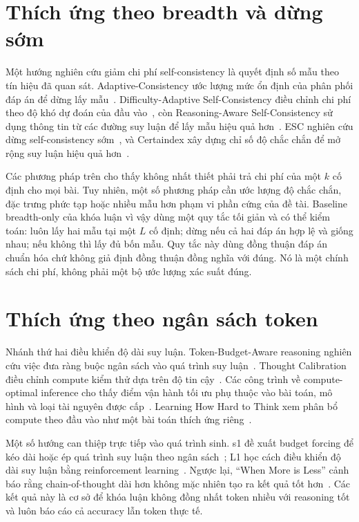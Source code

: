 \section{Thích ứng theo breadth và dừng sớm}

Một hướng nghiên cứu giảm chi phí self-consistency là quyết định số mẫu theo tín hiệu
đã quan sát. Adaptive-Consistency ước lượng mức ổn định của phân phối đáp án để dừng
lấy mẫu~\cite{aggarwal2023adaptive}. Difficulty-Adaptive Self-Consistency điều chỉnh
chi phí theo độ khó dự đoán của đầu vào~\cite{wang2025penny}, còn Reasoning-Aware
Self-Consistency sử dụng thông tin từ các đường suy luận để lấy mẫu hiệu quả
hơn~\cite{wan2025rasc}. ESC nghiên cứu dừng self-consistency sớm~\cite{li2024esc}, và
Certaindex xây dựng chỉ số độ chắc chắn để mở rộng suy luận hiệu quả
hơn~\cite{fu2025certaindex}.

Các phương pháp trên cho thấy không nhất thiết phải trả chi phí của một $k$ cố định
cho mọi bài. Tuy nhiên, một số phương pháp cần ước lượng độ chắc chắn, đặc trưng phức
tạp hoặc nhiều mẫu hơn phạm vi phần cứng của đề tài. Baseline breadth-only của khóa
luận vì vậy dùng một quy tắc tối giản và có thể kiểm toán: luôn lấy hai mẫu tại một $L$
cố định; dừng nếu cả hai đáp án hợp lệ và giống nhau; nếu không thì lấy đủ bốn mẫu.
Quy tắc này dùng đồng thuận đáp án chuẩn hóa chứ không giả định đồng thuận đồng nghĩa
với đúng. Nó là một chính sách chi phí, không phải một bộ ước lượng xác suất đúng.

\section{Thích ứng theo ngân sách token}

Nhánh thứ hai điều khiển độ dài suy luận. Token-Budget-Aware reasoning nghiên cứu việc
đưa ràng buộc ngân sách vào quá trình suy luận~\cite{han2025token}. Thought Calibration
điều chỉnh compute kiểm thử dựa trên độ tin cậy~\cite{wu2025thought}. Các công trình
về compute-optimal inference cho thấy điểm vận hành tối ưu phụ thuộc vào bài toán,
mô hình và loại tài nguyên được cấp~\cite{snell2025scaling,wu2024inference}. Learning
How Hard to Think xem phân bổ compute theo đầu vào như một bài toán thích ứng
riêng~\cite{damani2025hard}.

Một số hướng can thiệp trực tiếp vào quá trình sinh. s1 đề xuất budget forcing để kéo
dài hoặc ép quá trình suy luận theo ngân sách~\cite{muennighoff2025s1}; L1 học cách
điều khiển độ dài suy luận bằng reinforcement learning~\cite{aggarwal2025l1}. Ngược
lại, ``When More is Less'' cảnh báo rằng chain-of-thought dài hơn không mặc nhiên tạo
ra kết quả tốt hơn~\cite{wu2025moreless}. Các kết quả này là cơ sở để khóa luận không
đồng nhất token nhiều với reasoning tốt và luôn báo cáo cả accuracy lẫn token thực tế.

